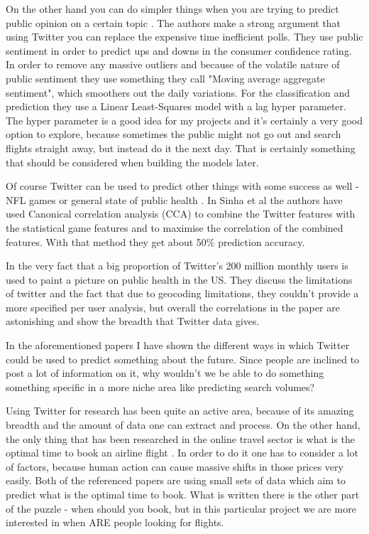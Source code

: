\documentclass[minf,frontabs,twoside,singlespacing,parskip]{infthesis}
\begin{document}
On the other hand you can do simpler things when you are trying to predict public opinion on a certain topic \cite{twitpoll}. The authors make a strong argument that using Twitter you can replace the expensive time inefficient polls. They use public sentiment in order to predict ups and downs in the consumer confidence rating. In order to remove any massive outliers and because of the volatile nature of public sentiment they use something they call "Moving average aggregate sentiment", which smoothers out the daily variations. For the classification and prediction they use a Linear Least-Squares model with a lag hyper parameter. The hyper parameter is a good idea for my projects and it's certainly a very good option to explore, because sometimes the public might not go out and search flights straight away, but instead do it the next day. That is certainly something that should be considered when building the models later.


Of course Twitter can be used to predict other things with some success as well - NFL games \cite{twitnfl} or general state of public health \cite{twitflu}.  In Sinha et al \cite{twitnfl} the authors have used Canonical correlation analysis (CCA) to combine the Twitter features with the statistical game features and to maximise the correlation of the combined features. With that method they get about 50\% prediction accuracy. 


In \cite{twitflu} the very fact that a big proportion of Twitter's 200 million monthly users is used to paint a picture on public health in the US. They discuss the limitations of twitter and the fact that due to geocoding limitations, they couldn't provide a more specified per user analysis, but overall the correlations in the paper are astonishing and show the breadth that Twitter data gives. 


In the aforementioned papers I have shown the different ways in which Twitter could be used to predict something about the future. Since people are inclined to post a lot of information on it, why wouldn't we be able to do something something specific in a more niche area like predicting search volumes?


Using Twitter for research has been quite an active area, because of its amazing breadth and the amount of data one can extract and process.
On the other hand, the only thing that has been researched in the online travel sector is what is the optimal time to book an airline flight \cite{Hamletkdd03,ijcai}.  In order to do it one has to consider a lot of factors, because human action can cause massive shifts in those prices very easily. 
Both of the referenced papers are using small sets of data which aim to predict what is the optimal time to book. What is written there is the other part of the puzzle - when should you book, but in this particular project we are more interested in when ARE people looking for flights.
\end{document}
